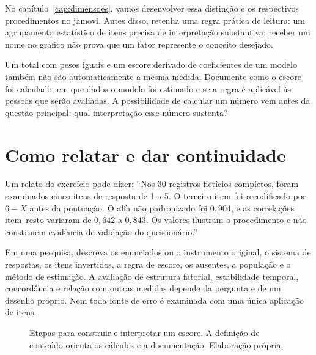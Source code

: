 No capítulo~\ref{cap:dimensoes}, vamos desenvolver essa distinção e os respectivos procedimentos no jamovi. Antes disso, retenha uma regra prática de leitura: um agrupamento estatístico de itens precisa de interpretação substantiva; receber um nome no gráfico não prova que um fator represente o conceito desejado.

Um total com pesos iguais e um escore derivado de coeficientes de um modelo também não são automaticamente a mesma medida. Documente como o escore foi calculado, em que dados o modelo foi estimado e se a regra é aplicável às pessoas que serão avaliadas. A possibilidade de calcular um número vem antes da questão principal: qual interpretação esse número sustenta?

\section{Como relatar e dar continuidade}

Um relato do exercício pode dizer: ``Nos 30 registros fictícios completos, foram examinados cinco itens de resposta de 1 a 5. O terceiro item foi recodificado por $6-X$ antes da pontuação. O alfa não padronizado foi $0{,}904$, e as correlações item--resto variaram de $0{,}642$ a $0{,}843$. Os valores ilustram o procedimento e não constituem evidência de validação do questionário.''

Em uma pesquisa, descreva os enunciados ou o instrumento original, o sistema de respostas, os itens invertidos, a regra de escore, os ausentes, a população e o método de estimação. A avaliação de estrutura fatorial, estabilidade temporal, concordância e relação com outras medidas depende da pergunta e de um desenho próprio. Nem toda fonte de erro é examinada com uma única aplicação de itens.

\begin{figure}[H]
\centering
{}
\caption{Etapas para construir e interpretar um escore. A definição de conteúdo orienta os cálculos e a documentação. Elaboração própria.}
\label{fig:roteiro-escore}
\end{figure}

